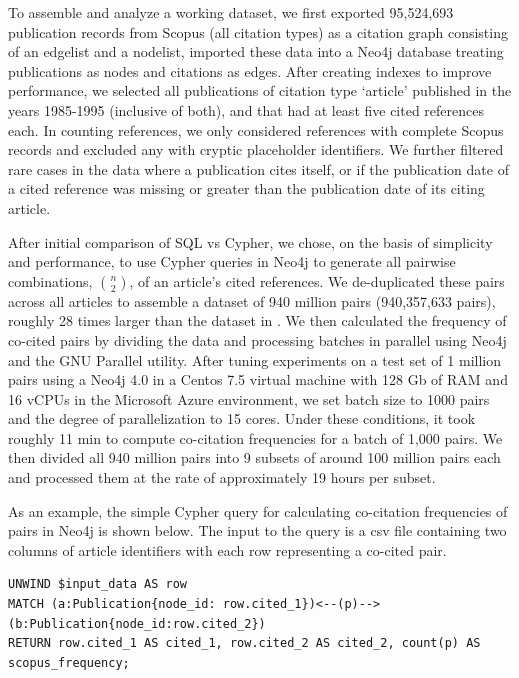 \documentclass[utf8]{frontiersSCNS}
\begin{document}
To assemble and analyze a working dataset, we first exported 95,524,693 publication records from Scopus (all citation types) as a citation graph consisting of an edgelist and a nodelist, imported these data into a Neo4j database treating publications as nodes and citations as edges. After creating indexes to improve performance, we selected all publications of citation type `article' published in the years 1985-1995 (inclusive of both), and that had at least five cited references each. In counting references, we only considered references with complete Scopus records and excluded any with cryptic placeholder identifiers. We further filtered rare cases in the data where a publication cites itself, or if the publication date of a cited reference was missing or greater than the publication date of its citing article. 

After initial comparison of SQL vs Cypher, we chose, on the basis of simplicity and performance, to use Cypher queries in Neo4j to generate all pairwise combinations, $n\choose 2$, of an article's cited references. We de-duplicated these pairs across all articles to assemble a dataset of 940 million pairs (940,357,633 pairs), roughly 28 times larger than the dataset in \cite{devarakonda_2020}. We then calculated the frequency of co-cited pairs by dividing the data and processing batches in parallel using Neo4j and the GNU Parallel utility.  After tuning experiments on a test set of 1 million pairs using a Neo4j 4.0 in a Centos 7.5 virtual machine with 128 Gb of RAM and 16 vCPUs in the Microsoft Azure environment, we set batch size to 1000 pairs and the degree of parallelization to 15 cores. Under these conditions, it took roughly 11 min to compute co-citation frequencies for a batch of 1,000 pairs. We then divided all 940 million pairs into 9 subsets of around 100 million pairs each and processed them at the rate of approximately 19 hours per subset. 

As an example, the simple Cypher query for calculating co-citation frequencies of pairs in Neo4j is shown below. The input to the query is a csv file containing two columns of article identifiers with each row representing a co-cited pair.  
\lstset{language=Pascal, basicstyle=\footnotesize} 
\begin{lstlisting}[frame=single]
UNWIND $input_data AS row
MATCH (a:Publication{node_id: row.cited_1})<--(p)-->(b:Publication{node_id:row.cited_2})
RETURN row.cited_1 AS cited_1, row.cited_2 AS cited_2, count(p) AS scopus_frequency;
\end{lstlisting}
\end{document}
